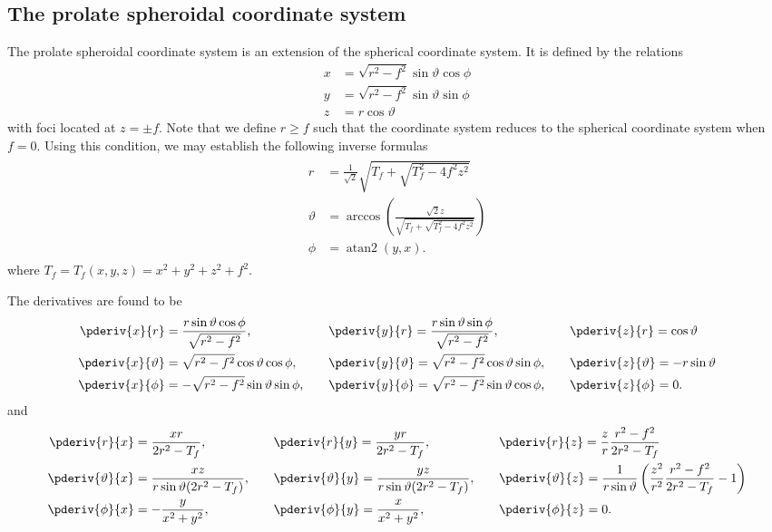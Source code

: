 \subsection{The prolate spheroidal coordinate system}
\label{Sec2:prolateSphericalCoordinateSystem}
The prolate spheroidal coordinate system is an extension of the spherical coordinate system. It is defined by the relations
\begin{align*}
	x &= \sqrt{r^2 - f^2}\sin\vartheta\cos\phi\\
	y &= \sqrt{r^2 - f^2}\sin\vartheta\sin\phi\\
	z &= r\cos\vartheta
\end{align*}
with foci located at $z = \pm f$. Note that we define $r\geq f$ such that the coordinate system reduces to the spherical coordinate system when $f=0$. Using this condition, we may establish the following inverse formulas
\begin{align}\label{Eq2:XtoProl}
\begin{split}
	r &= \frac{1}{\sqrt{2}}\sqrt{T_f + \sqrt{T_f^2-4f^2z^2}}\\
	\vartheta &= \arccos\left(\frac{\sqrt{2}z}{\sqrt{T_f + \sqrt{T_f^2-4f^2z^2}}}\right)\\
	\phi &= \operatorname{atan2}(y,x).
\end{split}
\end{align}
where $T_f = T_f(x,y,z) = x^2+y^2+z^2+f^2$.

The derivatives are found to be
\begin{equation}\label{Eq2:dXdProlateSphericalCoordinates}
\begin{alignedat}{4}
	\pderiv{x}{r} &= \frac{r\sin\vartheta\cos\phi}{\sqrt{r^2-f^2}},\qquad	&&\pderiv{y}{r} = \frac{r\sin\vartheta\sin\phi}{\sqrt{r^2-f^2}},\qquad	&&\pderiv{z}{r} = \cos\vartheta\\
	\pderiv{x}{\vartheta} &=\sqrt{r^2-f^2}\cos\vartheta\cos\phi,\qquad	&&\pderiv{y}{\vartheta} = \sqrt{r^2-f^2}\cos\vartheta\sin\phi,\qquad	&&\pderiv{z}{\vartheta} = -r\sin\vartheta\\
	\pderiv{x}{\phi} &= -\sqrt{r^2-f^2}\sin\vartheta\sin\phi,\qquad	&&\pderiv{y}{\phi} = \sqrt{r^2-f^2}\sin\vartheta\cos\phi,\qquad	&&\pderiv{z}{\phi} =0.
\end{alignedat}
\end{equation}
and
\begin{equation}\label{Eq2:dProlateSphericalCoordinatesdX}
\begin{alignedat}{4}
	\pderiv{r}{x} &= \frac{xr}{2r^2-T_f},\qquad	&&\pderiv{r}{y} = \frac{yr}{2r^2-T_f},\qquad	&&\pderiv{r}{z} = \frac{z}{r}\frac{r^2-f^2}{2r^2-T_f}\\
	\pderiv{\vartheta}{x} &= \frac{xz}{r\sin\vartheta (2r^2-T_f)},\qquad	&&\pderiv{\vartheta}{y} = \frac{yz}{r\sin\vartheta (2r^2-T_f)},\qquad	&&\pderiv{\vartheta}{z} = \frac{1}{r\sin\vartheta}\left(\frac{z^2}{r^2}\frac{r^2-f^2}{2r^2-T_f}-1\right)\\
	\pderiv{\phi}{x} &= -\frac{y}{x^2+y^2},\qquad	&&\pderiv{\phi}{y} = \frac{x}{x^2+y^2},\qquad	&&\pderiv{\phi}{z} = 0.
\end{alignedat}
\end{equation}

